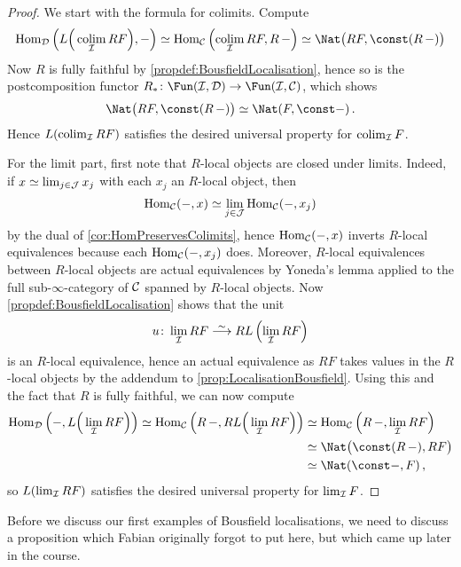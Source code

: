 \begin{proof}
	We start with the formula for colimits. Compute
	\begin{equation*}
		\Hom_\Dd\left(L\Big(\colimit_\Ii RF\Big),-\right)\simeq \Hom_\Cc\left(\colimit_\Ii RF,R\,-\right)\simeq \Nat\big(RF,\const (R\,-)\big)
	\end{equation*}
	Now $R$ is fully faithful by \cref{propdef:BousfieldLocalisation}, hence so is the postcomposition functor $R_*\colon \Fun(\Ii,\Dd)\morphism\Fun(\Ii,\Cc)$, which shows
	\begin{equation*}
		\Nat\big(RF,\const (R\,-)\big)\simeq \Nat(F,\const-)\,.\nopagebreak
	\end{equation*}
	Hence $L(\operatorname*{colim}_{\mathcal{I}} RF)$ satisfies the desired universal property for $\operatorname*{colim}_{\mathcal{I}} F$.
	
	For the limit part, first note that $R$-local objects are closed under limits. Indeed, if $x\simeq\operatorname*{lim}_{j\in \mathcal{J}}x_j$ with each $x_j$ an $R$-local object, then
	\begin{equation*}
		\operatorname{Hom}_{\mathcal{C}}(-,x)\simeq \operatorname*{lim}_{j\in \mathcal{J}}\operatorname{Hom}_{\mathcal{C}}(-,x_j)
	\end{equation*}
	by the dual of \cref{cor:HomPreservesColimits}, hence $\operatorname{Hom}_{\mathcal{C}}(-,x)$ inverts $R$-local equivalences because each $\operatorname{Hom}_{\mathcal{C}}(-,x_j)$ does. Moreover, $R$-local equivalences between $R$-local objects are actual equivalences by Yoneda's lemma applied to the full sub-$\infty$-category of $\mathcal{C}$ spanned by $R$-local objects. Now \cref{propdef:BousfieldLocalisation} shows that the unit
	\begin{equation*}
		u\colon \limit_\Ii RF\isomorphism RL\left(\limit_\Ii RF\right)
	\end{equation*}
	is an $R$-local equivalence, hence an actual equivalence as $RF$ takes values in the $R$-local objects by the addendum to \cref{prop:LocalisationBousfield}. Using this and the fact that $R$ is fully faithful, we can now compute
	\begin{align*}
		\Hom_\Dd\left(-,L\Big(\limit_\Ii RF\Big)\right)\simeq \Hom_\Cc\left(R\,-,RL\Big(\limit_\Ii RF\Big)\right)&\simeq \Hom_\Cc\left(R\,-,\limit_\Ii RF\right)\\
		&\simeq \Nat\big(\const(R\,-),RF\big)\\
		&\simeq \Nat(\const-,F)\,,%
	\end{align*}
	so $L(\operatorname*{lim}_{\mathcal{I}} RF)$ satisfies the desired universal property for $\operatorname*{lim}_{\mathcal{I}} F$.
\end{proof}
Before we discuss our first examples of Bousfield localisations, we need to discuss a proposition which Fabian originally forgot to put here, but which came up later in the course.
